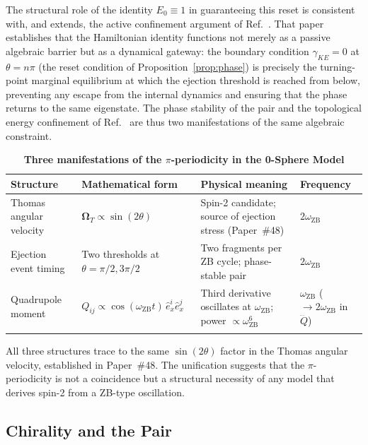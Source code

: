 \documentclass[%
 reprint, amsmath,amssymb, aps, prb, ]{revtex4-2}
\numberwithin{equation}{section}
\newcommand{\iphase}{\theta}
\newcommand{\omZB}{\omega_{\text{ZB}}}
\newcommand{\OmT}{\boldsymbol{\Omega}_T}
\newcommand{\ehat}[1]{\hat{e}_{#1}}
\begin{document}
The structural role of the identity $E_0 \equiv 1$ in guaranteeing this reset is consistent with, and extends, the active confinement argument of Ref.~\cite{hanamura56}. That paper establishes that the Hamiltonian identity functions not merely as a passive algebraic barrier but as a dynamical gateway: the boundary condition $\gamma_{KE}=0$ at $\iphase = n\pi$ (the reset condition of Proposition~\ref{prop:phase}) is precisely the turning-point marginal equilibrium at which the ejection threshold is reached from below, preventing any escape from the internal dynamics and ensuring that the phase returns to the same eigenstate. The phase stability of the pair and the topological energy confinement of Ref.~\cite{hanamura56} are thus two manifestations of the same algebraic constraint.

\begin{table}[t!]
\centering
\caption{\textbf{Three manifestations of the $\pi$-periodicity in the 0-Sphere Model}}
\label{tab:pi_period}
\renewcommand{\arraystretch}{1.4}
\begin{tabular}{p{3.5cm}p{4.5cm}p{4.5cm}p{3.0cm}}
\toprule
\textbf{Structure} & \textbf{Mathematical form} & \textbf{Physical meaning} & \textbf{Frequency} \\
\midrule
Thomas angular velocity
& $\OmT \propto \sin(2\iphase)$
& Spin-2 candidate; source of ejection stress (Paper~\#48)
& $2\omZB$ \\
\addlinespace[0.3cm]
Ejection event timing
& Two thresholds at $\iphase = \pi/2, 3\pi/2$
& Two fragments per ZB cycle; phase-stable pair
& $2\omZB$ \\
\addlinespace[0.3cm]
Quadrupole moment
& $Q_{ij} \propto \cos(\omZB t)\,\ehat{x}^i\ehat{x}^j$
& Third derivative oscillates at $\omZB$; power $\propto \omZB^6$
& $\omZB$ ($\to 2\omZB$ in $\dddot{Q}$) \\
\addlinespace[0.2cm]
\bottomrule
\end{tabular}
\vspace{0.2cm}
\begin{minipage}{0.95\textwidth}
\justifying\footnotesize
All three structures trace to the same $\sin(2\iphase)$ factor in the Thomas angular velocity, established in Paper~\#48. The unification suggests that the $\pi$-periodicity is not a coincidence but a structural necessity of any model that derives spin-2 from a ZB-type oscillation.
\end{minipage}
\end{table}

\subsection{Chirality and the Pair}
\end{document}
